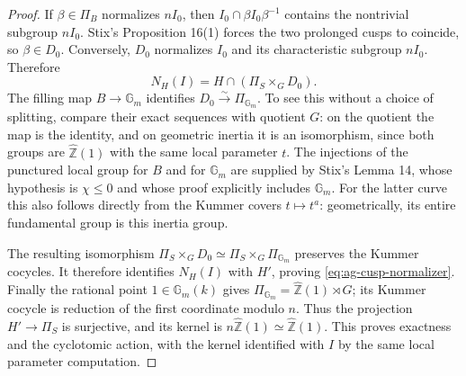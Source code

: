 \begin{proof}
If $\beta\in\Pi_B$ normalizes $nI_0$, then
$I_0\cap\beta I_0\beta^{-1}$ contains the nontrivial subgroup
$nI_0$. Stix's Proposition 16(1) forces the two prolonged cusps
to coincide, so $\beta\in D_0$. Conversely, $D_0$ normalizes
$I_0$ and its characteristic subgroup $nI_0$. Therefore
\[
 N_H(I)=H\cap(\Pi_S\times_G D_0).
\]
The filling map $B\to\mathbb G_m$ identifies
$D_0\xrightarrow{\sim}\Pi_{\mathbb G_m}$.
To see this without a choice of splitting, compare their exact
sequences with quotient $G$: on the quotient the map is the
identity, and on geometric inertia it is an isomorphism, since
both groups are $\widehat{\mathbb Z}(1)$ with the same local
parameter $t$. The injections of the punctured local group for
$B$ and for $\mathbb G_m$ are supplied by Stix's Lemma 14,
whose hypothesis is $\chi\le0$ and whose proof explicitly includes
$\mathbb G_m$. For the latter curve this also follows directly
from the Kummer covers $t\mapsto t^a$: geometrically, its entire
fundamental group is this inertia group.

The resulting isomorphism
$\Pi_S\times_GD_0\simeq\Pi_S\times_G\Pi_{\mathbb G_m}$
preserves the Kummer cocycles. It therefore identifies $N_H(I)$
with $H'$, proving \eqref{eq:ag-cusp-normalizer}.
Finally the rational point $1\in\mathbb G_m(k)$ gives
$\Pi_{\mathbb G_m}=\widehat{\mathbb Z}(1)\rtimes G$; its Kummer
cocycle is reduction of the first coordinate modulo $n$.
Thus the projection $H'\to\Pi_S$ is surjective, and its kernel
is $n\widehat{\mathbb Z}(1)\simeq\widehat{\mathbb Z}(1)$.
This proves exactness and the cyclotomic action, with the kernel
identified with $I$ by the same local parameter computation.
\end{proof}

